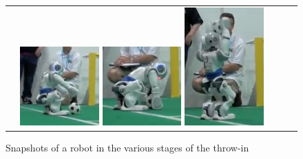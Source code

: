 \documentclass[pdftex,11pt,a4paper]{report}
\begin{document}
\begin{figure}[ht]
    \begin{center}
        \begin{tabular}{ccc}
            \includegraphics[width=0.3\textwidth]{figures/throwIn1}
            \includegraphics[width=0.3\textwidth]{figures/throwIn2}
            \includegraphics[width=0.3\textwidth]{figures/throwIn3}
        \end{tabular}
    \end{center}
    \caption{Snapshots of a robot in the various stages of the throw-in}
    \label{fig:throwIn}
\end{figure}
\end{document}
